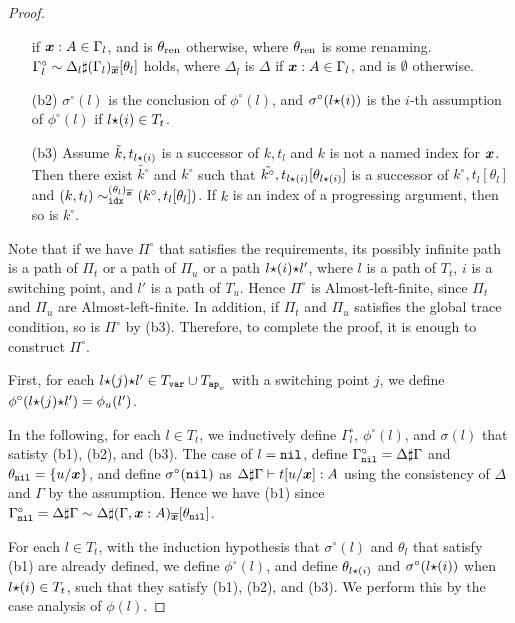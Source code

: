 \begin{proof}
\begin{itemize}
    if $\boldsymbol{x}:A \in \Gamma_l$, and is $\theta_{{\rm ren}}$ otherwise, 
    where $\theta_{{\rm ren}}$ is some renaming.
    $\Gamma^\circ_l \sim \Delta_l\sharp(\Gamma_l)_{\overline{\boldsymbol{x}}}[\theta_l]$ holds,
    where $\Delta_l$ is $\Delta$ if $\boldsymbol{x}:A\in\Gamma_l$, and is $\emptyset$ otherwise. 
  \item[(b2)]
    $\sigma^\circ(l)$ is the conclusion of $\phi^\circ(l)$,
    and $\sigma^\circ(l{\star}(i))$ is the $i$-th assumption of $\phi^\circ(l)$ if $l{\star}(i) \in T_t$.
  \item[(b3)]
    Assume $\tilde{k},t_{l{\star}(i)}$ is a successor of $k,t_l$ and $k$ is not a named index for $\boldsymbol{x}$. 
    Then there exist $\tilde{k^\circ}$ and $k^\circ$ such that
    $\tilde{k^\circ},t_{l{\star}(i)}[\theta_{l{\star}(i)}]$ is a successor of $k^\circ,t_l[\theta_l]$ and 
    $(k,t_l) \sim^{(\theta_l)_{\overline{\boldsymbol{x}}}}_{{\tt idx}} (k^\circ,t_l[\theta_l])$.
    If $k$ is an index of a progressing argument, then so is $k^\circ$.    
  \end{itemize}
  
  Note that if we have $\Pi^\circ$ that satisfies the requirements, its possibly infinite path
  is a path of $\Pi_t$ or a path of $\Pi_u$ or a path $l{\star}(i){\star} l'$,
  where $l$ is a path of $T_t$, $i$ is a switching point, and $l'$ is a path of $T_u$.
  Hence $\Pi^\circ$ is Almost-left-finite, since $\Pi_t$ and $\Pi_u$ are Almost-left-finite.
  In addition, if $\Pi_t$ and $\Pi_u$ satisfies the global trace condition,
  so is $\Pi^\circ$ by (b3). 
  Therefore, to complete the proof, it is enough to construct $\Pi^\circ$. 

  First, for each $l{\star}(j){\star} l'\in T_{\tt var}\cup T_{{\tt ap}_{\mbox{\tiny $v$}}}$ with a switching point $j$, 
  we define $\phi^\circ(l{\star}(j){\star} l') = \phi_u(l')$. 

  In the following, for each $l\in T_t$, we inductively define $\Gamma^\circ_l$, $\phi^\circ(l)$, and $\sigma(l)$
  that satisty (b1), (b2), and (b3).
  The case of $l={\tt nil}$, define $\Gamma^\circ_{\tt nil} = \Delta\sharp\Gamma$ and $\theta_{\tt nil}=\{u/\boldsymbol{x}\}$,
  and define $\sigma^\circ({\tt nil})$ as $\Delta\sharp\Gamma\vdash t[u/\boldsymbol{x}]:A$
  using the consistency of $\Delta$ and $\Gamma$ by the assumption. 
  Hence we have (b1) since
  $\Gamma^\circ_{\tt nil} = \Delta\sharp\Gamma \sim \Delta\sharp(\Gamma,\boldsymbol{x}:A)_{\overline{\boldsymbol{x}}}[\theta_{\tt nil}]$. 

  For each $l\in T_t$,
  with the induction hypothesis that $\sigma^\circ(l)$ and $\theta_l$ that satisfy (b1) are already defined, 
  we define $\phi^\circ(l)$, and define $\theta_{l{\star}(i)}$ and $\sigma^\circ(l{\star}(i))$ when $l{\star}(i)\in T_t$, 
  such that they satisfy (b1), (b2), and (b3). 
  We perform this by the case analysis of $\phi(l)$.


\end{proof}
